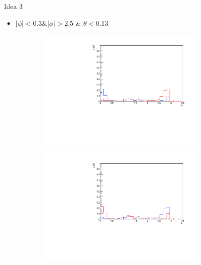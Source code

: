 \documentclass[11pt]{beamer}
\begin{document}
\begin{frame}{Idea 3}
\begin{itemize}
\item $|\phi| < 0.3 \& |\phi| > 2.5$ \& $\theta < 0.13$
\end{itemize}
\begin{figure}
\begin{subfigure}{0.45\textwidth}
\includegraphics[width=0.9\textwidth]{first/up_pdf/test_u/h_phi_test_SPi_combined.pdf}
\end{subfigure}
\begin{subfigure}{0.45\textwidth}
\includegraphics[width=0.9\textwidth]{first/down_pdf/test_d/h_phi_test_SPi_combined.pdf}
\end{subfigure}
\end{figure}
\end{frame}
\end{document}
